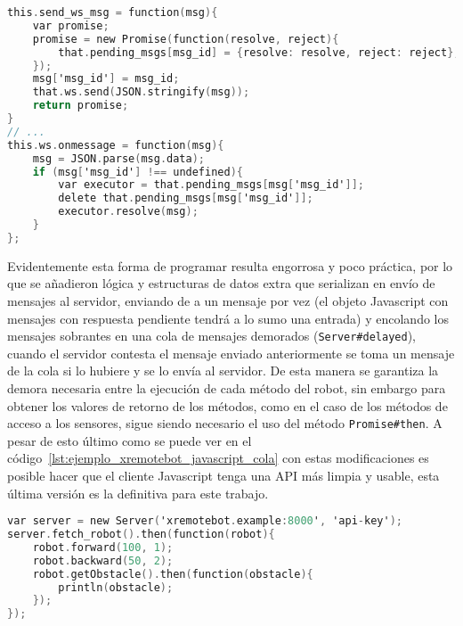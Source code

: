 \begin{lstlisting}[language=C,
caption={Ejemplo simplificado de la implementación de XRemoteBot con
Promises dentro del constructor Server en remotebot.js},
label=lst:ejemplo_xremotebot_javascript_promises]
this.send_ws_msg = function(msg){
    var promise;
    promise = new Promise(function(resolve, reject){
        that.pending_msgs[msg_id] = {resolve: resolve, reject: reject};
    });
    msg['msg_id'] = msg_id;
    that.ws.send(JSON.stringify(msg));
    return promise;
}
// ...
this.ws.onmessage = function(msg){
    msg = JSON.parse(msg.data);
    if (msg['msg_id'] !== undefined){
        var executor = that.pending_msgs[msg['msg_id']];
        delete that.pending_msgs[msg['msg_id']];
        executor.resolve(msg);
    }
};
\end{lstlisting}


Evidentemente esta forma de programar resulta engorrosa y poco práctica,
por lo que se añadieron
lógica y estructuras de datos extra que serializan en envío de mensajes al
servidor, enviando de a un mensaje por vez (el objeto Javascript con
mensajes con respuesta pendiente tendrá a lo sumo una entrada)
y encolando los mensajes sobrantes
en una cola de mensajes demorados (\texttt{Server\#delayed}), cuando
el servidor contesta el mensaje enviado anteriormente se toma un mensaje
de la cola si lo hubiere y se lo envía al servidor. De esta manera
se garantiza la demora necesaria entre la ejecución de cada método
del robot, sin embargo para obtener los valores de retorno de los métodos,
como en el caso de los métodos de acceso a los sensores, sigue siendo
necesario el uso del método \texttt{Promise\#then}. A pesar de esto último
como se puede ver en el código~\ref{lst:ejemplo_xremotebot_javascript_cola}
con estas modificaciones es posible hacer que el cliente Javascript
tenga una API más limpia y usable, esta última versión es la definitiva
para este trabajo.

\begin{lstlisting}[language=C,
caption={Ejemplo de XRemoteBot en Javascript con empleo de una cola para
serializar mensajes},
label=lst:ejemplo_xremotebot_javascript_cola]
var server = new Server('xremotebot.example:8000', 'api-key');
server.fetch_robot().then(function(robot){
    robot.forward(100, 1);
    robot.backward(50, 2);
    robot.getObstacle().then(function(obstacle){
        println(obstacle);
    });
});
\end{lstlisting}


